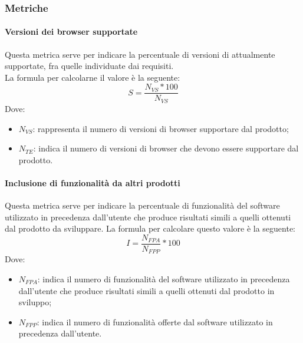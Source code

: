 \documentclass[../PianoDiQualifica.tex]{subfiles}
\begin{document}
				\subsubsection{Metriche}
					\paragraph{Versioni dei browser supportate}
					Questa metrica serve per indicare la percentuale di versioni di  attualmente supportate, fra quelle individuate dai requisiti. \\La formula per calcolarne il valore è la seguente:
					\begin{equation*}
						S = \frac{N_{VS} * 100}{N_{VS}}
					\end{equation*}
					Dove:
					\begin{itemize}
						\item \textbf{$N_{VS}$}: rappresenta il numero di versioni di browser supportare dal prodotto;
						\item \textbf{$N_{TE}$}: indica il numero di versioni di browser che devono essere supportare dal prodotto.
					\end{itemize}
					
					\paragraph{Inclusione di funzionalità da altri prodotti}
					Questa metrica serve per indicare la percentuale di funzionalità del software utilizzato in precedenza dall'utente che produce risultati simili a quelli ottenuti dal prodotto da sviluppare. La formula per calcolare questo valore è la seguente:
					\begin{equation*}
						I = \frac{N_{FPA}}{N_{FPP}} * 100
					\end{equation*}
					Dove:
					\begin{itemize}
						\item \textbf{$N_{FPA}$}: indica il numero di funzionalità del software utilizzato in precedenza dall'utente che produce risultati simili a quelli ottenuti dal prodotto in sviluppo;
						\item \textbf{$N_{FPP}$}: indica il numero di funzionalità offerte dal software utilizzato in precedenza dall'utente.
					\end{itemize}		
\end{document}
